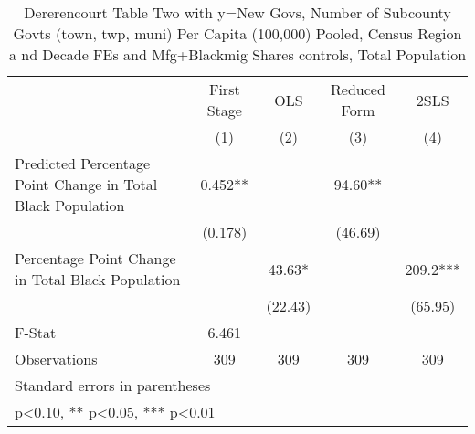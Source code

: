 \begin{table}[htbp]\centering
\def\sym#1{\ifmmode^{#1}\else\(^{#1}\)\fi}
\caption{Dererencourt Table Two with y=New Govs, Number of Subcounty Govts (town, twp, muni) Per Capita (100,000) Pooled, Census Region a nd Decade FEs and Mfg+Blackmig Shares controls, Total Population}
\begin{tabular}{l*{4}{c}}
\toprule
                    & First Stage   &         OLS   &Reduced Form   &        2SLS   \\
                    &\multicolumn{1}{c}{(1)}   &\multicolumn{1}{c}{(2)}   &\multicolumn{1}{c}{(3)}   &\multicolumn{1}{c}{(4)}   \\
\midrule
Predicted Percentage Point Change in Total Black Population&       0.452** &               &       94.60** &               \\
                    &     (0.178)   &               &     (46.69)   &               \\
\addlinespace
Percentage Point Change in Total Black Population&               &       43.63*  &               &       209.2***\\
                    &               &     (22.43)   &               &     (65.95)   \\
\midrule
F-Stat              &       6.461   &               &               &               \\
Observations        &         309   &         309   &         309   &         309   \\
\bottomrule
\multicolumn{5}{l}{\footnotesize Standard errors in parentheses}\\
\multicolumn{5}{l}{\footnotesize * p<0.10, ** p<0.05, *** p<0.01}\\
\end{tabular}
\end{table}
